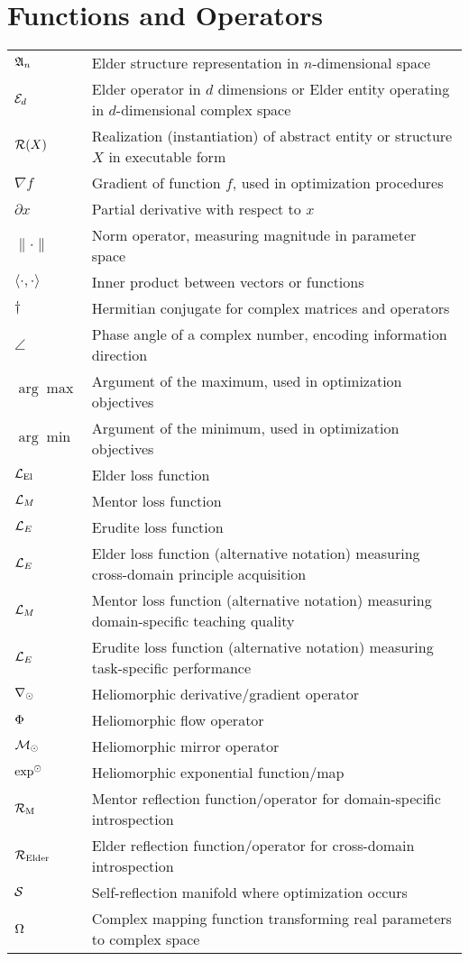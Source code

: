 \section*{Functions and Operators}
\vspace{-0.5em}
\begin{tabular}{p{3cm} p{12cm}}
$\mathfrak{A}_{n}$ & Elder structure representation in $n$-dimensional space \\
$\mathcal{E}_{d}$ & Elder operator in $d$ dimensions or Elder entity operating in $d$-dimensional complex space \\
$\mathcal{R}(X)$ & Realization (instantiation) of abstract entity or structure $X$ in executable form \\
$\nabla f$ & Gradient of function $f$, used in optimization procedures \\
$\partial x$ & Partial derivative with respect to $x$ \\
$\| \cdot \|$ & Norm operator, measuring magnitude in parameter space \\
$\langle \cdot, \cdot \rangle$ & Inner product between vectors or functions \\
$\dagger$ & Hermitian conjugate for complex matrices and operators \\
$\angle$ & Phase angle of a complex number, encoding information direction \\
$\arg\max$ & Argument of the maximum, used in optimization objectives \\
$\arg\min$ & Argument of the minimum, used in optimization objectives \\
$\mathcal{L}_{\text{El}}$ & Elder loss function \\
$\mathcal{L}_M$ & Mentor loss function \\
$\mathcal{L}_E$ & Erudite loss function \\
$\mathcal{L}_E$ & Elder loss function (alternative notation) measuring cross-domain principle acquisition \\
$\mathcal{L}_M$ & Mentor loss function (alternative notation) measuring domain-specific teaching quality \\
$\mathcal{L}_E$ & Erudite loss function (alternative notation) measuring task-specific performance \\
$\nabla_{\odot}$ & Heliomorphic derivative/gradient operator \\
$\Phi$ & Heliomorphic flow operator \\
$\mathcal{M}_{\odot}$ & Heliomorphic mirror operator \\
$\exp^{\odot}$ & Heliomorphic exponential function/map \\
$\mathcal{R}_{\text{M}}$ & Mentor reflection function/operator for domain-specific introspection \\
$\mathcal{R}_{\text{Elder}}$ & Elder reflection function/operator for cross-domain introspection \\
$\mathcal{S}$ & Self-reflection manifold where optimization occurs \\
$\Omega$ & Complex mapping function transforming real parameters to complex space \\
\end{tabular}


